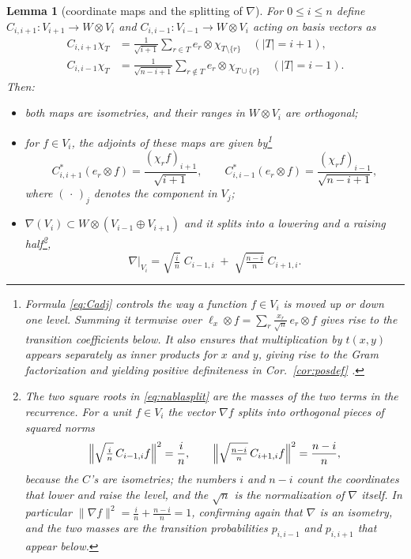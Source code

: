 \documentclass[11pt]{amsart}
\theoremstyle{plain}
\newtheorem{lemma}[theorem]{Lemma}
\theoremstyle{remark}
\begin{document}
\begin{lemma}[coordinate maps and the splitting of $\nabla$]\label{lem:coordmaps}
For $0\le i\le n$ define $C_{i,i+1}\colon V_{i+1}\to W\otimes V_i$ and
$C_{i,i-1}\colon V_{i-1}\to W\otimes V_i$ acting on basis vectors as
\begin{equation}\label{eq:Cdef}
\begin{aligned}
 C_{i,i+1}\chi_T&=\frac1{\sqrt{i+1}}\sum_{r\in T}e_r\otimes\chi_{T\setminus\{r\}}
 \quad(|T|=i+1),\\
  C_{i,i-1}\chi_{T}&=\frac1{\sqrt{n-i+1}}\sum_{r\notin T}e_r\otimes\chi_{T\cup\{r\}}
 \quad(|T|=i-1).
 \end{aligned}
\end{equation}
Then:
\begin{itemize}
\item[(i)] both maps are isometries, and their ranges in $W\otimes V_i$ are
orthogonal;
\item[(ii)]  for $f\in V_i$, the adjoints of these maps are given by\footnote{Formula \eqref{eq:Cadj} controls the way a function $f\in V_i$ is moved up or down one level. Summing it termwise over $\ell_x\otimes f=\sum_r\frac{x_r}{\sqrt n}\,e_r\otimes f$ gives rise to the transition coefficients below. It also ensures that multiplication by $t(x,y)$ appears separately as inner products for $x$ and $y$, giving rise to the Gram factorization and yielding positive definiteness in Cor.~\ref{cor:posdef}
.}
\begin{equation}\label{eq:Cadj}
 C^{*}_{i,i+1}(e_r\otimes f)=\frac{(\chi_rf)_{i+1}}{\sqrt{i+1}},
 \qquad
 C^{*}_{i,i-1}(e_r\otimes f)=\frac{(\chi_rf)_{i-1}}{\sqrt{n-i+1}},
\end{equation}
where $(\,\cdot\,)_j$ denotes the component in $V_j$;
\item[(iii)] $\nabla(V_i)\subset W\otimes(V_{i-1}\oplus V_{i+1})$ and
it splits into a lowering and a raising half\footnote{
The two square roots in \eqref{eq:nablasplit} are the \emph{masses} of the two terms in the recurrence. For a unit $f\in V_i$ the vector $\nabla f$ splits into orthogonal pieces of squared
norms
\[
 \Bigl\|\sqrt{\tfrac in}\,C_{i-1,i}f\Bigr\|^{2}=\frac in,
 \qquad
 \Bigl\|\sqrt{\tfrac{n-i}{n}}\,C_{i+1,i}f\Bigr\|^{2}=\frac{n-i}{n},
\]
because the $C$'s are isometries; the numbers $i$ and $n-i$ count the
coordinates that lower and raise the level, and the $\sqrt n$ is the
normalization of $\nabla$ itself. In particular
$\|\nabla f\|^2=\frac in+\frac{n-i}{n}=1$, confirming again that $\nabla$ is an
isometry, and the two masses are the transition probabilities $p_{i,i-1}$ and
$p_{i,i+1}$ that appear below.},
\begin{equation}\label{eq:nablasplit}
 \nabla|_{V_i}
 =\sqrt{\tfrac in}\;C_{i-1,i}\;+\;\sqrt{\tfrac{n-i}{n}}\;C_{i+1,i}.
\end{equation}
\end{itemize}
\end{lemma}
\end{document}
